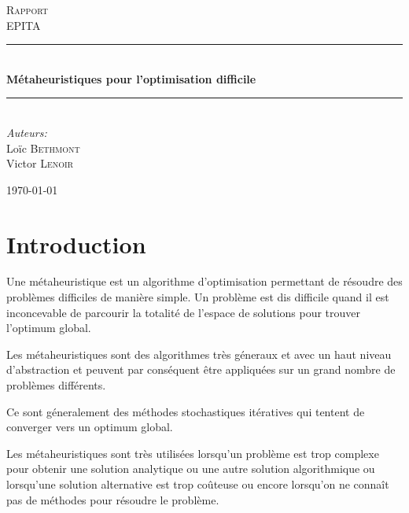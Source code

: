 \documentclass{report}
\newcommand{\HRule}{\rule{\linewidth}{0.5mm}}
\begin{document}
\begin{titlepage}

  \begin{center}

    \textsc{\LARGE Rapport}\\[1.5cm]

    \textsc{\Large EPITA}\\[0.5cm]

    \HRule \\[0.4cm]
           { \huge \bfseries Métaheuristiques pour l'optimisation difficile}\\[0.4cm]

           \HRule \\[1.5cm]

           \large
           \emph{Auteurs:}\\
           Loïc \textsc{Bethmont}\\
           Victor \textsc{Lenoir}\\

           \vfill

           {\large \today}

  \end{center}

\end{titlepage}
\newpage
\tableofcontents
\newpage

\chapter{Introduction}

Une métaheuristique est un algorithme d'optimisation permettant de
résoudre des problèmes difficiles de manière simple.  Un problème est
dis difficile quand il est inconcevable de parcourir la totalité de
l'espace de solutions pour trouver l'optimum global.


Les métaheuristiques sont des algorithmes très géneraux et avec un
haut niveau d'abstraction et peuvent par conséquent être appliquées sur
un grand nombre de problèmes différents.


Ce sont géneralement des méthodes stochastiques itératives qui tentent
de converger vers un optimum global.


Les métaheuristiques sont très utilisées lorsqu'un problème est trop
complexe pour obtenir une solution analytique ou une autre solution
algorithmique ou lorsqu'une solution alternative est trop coûteuse ou
encore lorsqu'on ne connaît pas de méthodes pour résoudre le problème.
\end{document}
